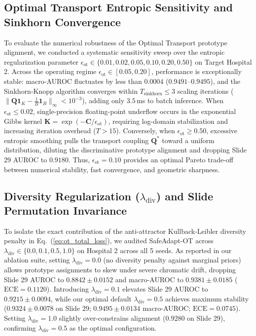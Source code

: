 \documentclass[journal]{IEEEtran}
\begin{document}
\subsection{Optimal Transport Entropic Sensitivity and Sinkhorn Convergence}
\label{sec:ot_sensitivity}
To evaluate the numerical robustness of the Optimal Transport prototype alignment, we conducted a systematic sensitivity sweep over the entropic regularization parameter $\epsilon_{\text{ot}} \in \{0.01, 0.02, 0.05, 0.10, 0.20, 0.50\}$ on Target Hospital 2. Across the operating regime $\epsilon_{\text{ot}} \in [0.05, 0.20]$, performance is exceptionally stable: macro-AUROC fluctuates by less than $0.0004$ ($0.9491$--$0.9495$), and the Sinkhorn-Knopp algorithm converges within $T_{\text{sinkhorn}} \le 3$ scaling iterations ($\|\mathbf{Q} \mathbf{1}_K - \frac{1}{B}\mathbf{1}_B\|_\infty < 10^{-3}$), adding only $3.5$\,ms to batch inference. When $\epsilon_{\text{ot}} \le 0.02$, single-precision floating-point underflow occurs in the exponential Gibbs kernel $\mathbf{K} = \exp(-\mathbf{C}/\epsilon_{\text{ot}})$, requiring log-domain stabilization and increasing iteration overhead ($T > 15$). Conversely, when $\epsilon_{\text{ot}} \ge 0.50$, excessive entropic smoothing pulls the transport coupling $\mathbf{Q}^*$ toward a uniform distribution, diluting the discriminative prototype alignment and dropping Slide 29 AUROC to $0.9180$. Thus, $\epsilon_{\text{ot}} = 0.10$ provides an optimal Pareto trade-off between numerical stability, fast convergence, and geometric sharpness.

\subsection{Diversity Regularization ($\lambda_{\text{div}}$) and Slide Permutation Invariance}
\label{sec:e1_e4_ablations}
To isolate the exact contribution of the anti-attractor Kullback-Leibler diversity penalty in Eq.~(\ref{eq:ot_total_loss}), we audited SafeAdapt-OT across $\lambda_{\text{div}} \in \{0.0, 0.1, 0.5, 1.0\}$ on Hospital 2 across all 5 seeds. As reported in our ablation suite, setting $\lambda_{\text{div}} = 0.0$ (no diversity penalty against marginal priors) allows prototype assignments to skew under severe chromatic drift, dropping Slide 29 AUROC to $0.8842 \pm 0.0152$ and macro-AUROC to $0.9381 \pm 0.0185$ ($\text{ECE} = 0.1120$). Introducing $\lambda_{\text{div}} = 0.1$ elevates Slide 29 AUROC to $0.9215 \pm 0.0094$, while our optimal default $\lambda_{\text{div}} = 0.5$ achieves maximum stability ($\mathbf{0.9324} \pm 0.0078$ on Slide 29; $\mathbf{0.9495} \pm 0.0134$ macro-AUROC; $\text{ECE} = 0.0745$). Setting $\lambda_{\text{div}} = 1.0$ slightly over-constrains alignment ($0.9280$ on Slide 29), confirming $\lambda_{\text{div}} = 0.5$ as the optimal configuration.
\end{document}
